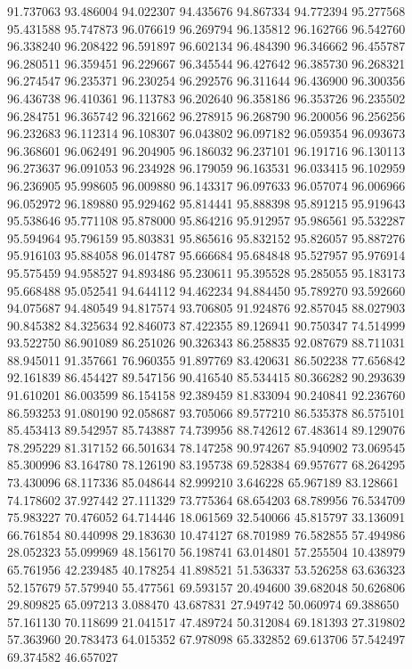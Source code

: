 91.737063
93.486004
94.022307
94.435676
94.867334
94.772394
95.277568
95.431588
95.747873
96.076619
96.269794
96.135812
96.162766
96.542760
96.338240
96.208422
96.591897
96.602134
96.484390
96.346662
96.455787
96.280511
96.359451
96.229667
96.345544
96.427642
96.385730
96.268321
96.274547
96.235371
96.230254
96.292576
96.311644
96.436900
96.300356
96.436738
96.410361
96.113783
96.202640
96.358186
96.353726
96.235502
96.284751
96.365742
96.321662
96.278915
96.268790
96.200056
96.256256
96.232683
96.112314
96.108307
96.043802
96.097182
96.059354
96.093673
96.368601
96.062491
96.204905
96.186032
96.237101
96.191716
96.130113
96.273637
96.091053
96.234928
96.179059
96.163531
96.033415
96.102959
96.236905
95.998605
96.009880
96.143317
96.097633
96.057074
96.006966
96.052972
96.189880
95.929462
95.814441
95.888398
95.891215
95.919643
95.538646
95.771108
95.878000
95.864216
95.912957
95.986561
95.532287
95.594964
95.796159
95.803831
95.865616
95.832152
95.826057
95.887276
95.916103
95.884058
96.014787
95.666684
95.684848
95.527957
95.976914
95.575459
94.958527
94.893486
95.230611
95.395528
95.285055
95.183173
95.668488
95.052541
94.644112
94.462234
94.884450
95.789270
93.592660
94.075687
94.480549
94.817574
93.706805
91.924876
92.857045
88.027903
90.845382
84.325634
92.846073
87.422355
89.126941
90.750347
74.514999
93.522750
86.901089
86.251026
90.326343
86.258835
92.087679
88.711031
88.945011
91.357661
76.960355
91.897769
83.420631
86.502238
77.656842
92.161839
86.454427
89.547156
90.416540
85.534415
80.366282
90.293639
91.610201
86.003599
86.154158
92.389459
81.833094
90.240841
92.236760
86.593253
91.080190
92.058687
93.705066
89.577210
86.535378
86.575101
85.453413
89.542957
85.743887
74.739956
88.742612
67.483614
89.129076
78.295229
81.317152
66.501634
78.147258
90.974267
85.940902
73.069545
85.300996
83.164780
78.126190
83.195738
69.528384
69.957677
68.264295
73.430096
68.117336
85.048644
82.999210
3.646228
65.967189
83.128661
74.178602
37.927442
27.111329
73.775364
68.654203
68.789956
76.534709
75.983227
70.476052
64.714446
18.061569
32.540066
45.815797
33.136091
66.761854
80.440998
29.183630
10.474127
68.701989
76.582855
57.494986
28.052323
55.099969
48.156170
56.198741
63.014801
57.255504
10.438979
65.761956
42.239485
40.178254
41.898521
51.536337
53.526258
63.636323
52.157679
57.579940
55.477561
69.593157
20.494600
39.682048
50.626806
29.809825
65.097213
3.088470
43.687831
27.949742
50.060974
69.388650
57.161130
70.118699
21.041517
47.489724
50.312084
69.181393
27.319802
57.363960
20.783473
64.015352
67.978098
65.332852
69.613706
57.542497
69.374582
46.657027
